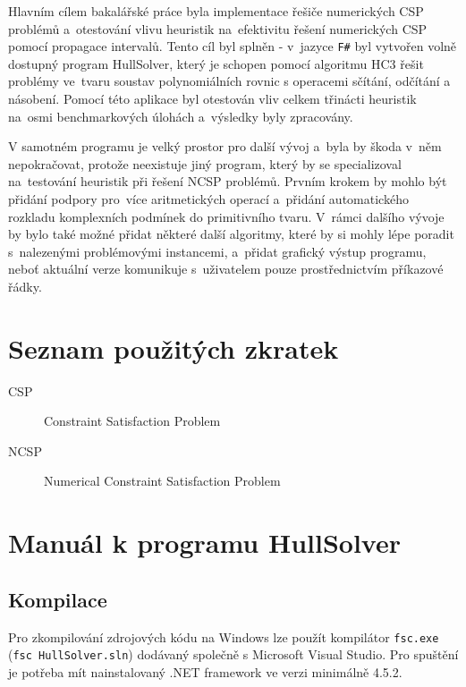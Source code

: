 \documentclass[thesis=B,czech]{FITthesis}[2012/06/26]
\theoremstyle{definition}
\begin{document}
\begin{conclusion}
Hlavním cílem bakalářské práce byla implementace řešiče numerických CSP problémů a~otestování vlivu heuristik na~efektivitu řešení numerických CSP pomocí propagace intervalů. Tento cíl byl splněn - v~jazyce \texttt{F\#} byl vytvořen volně dostupný program HullSolver, který je schopen pomocí algoritmu HC3 řešit problémy ve~tvaru soustav polynomiálních rovnic s operacemi sčítání, odčítání a násobení. Pomocí této aplikace byl otestován vliv celkem třinácti heuristik na~osmi benchmarkových úlohách a~výsledky byly zpracovány.

V samotném programu je velký prostor pro další vývoj a~byla by škoda v~něm nepokračovat, protože neexistuje jiný program, který by se specializoval na~testování heuristik při řešení NCSP problémů. Prvním krokem by mohlo být přidání podpory pro~více aritmetických operací a~přidání automatického rozkladu komplexních podmínek do primitivního tvaru. V~rámci dalšího vývoje by bylo také možné přidat některé další algoritmy, které by si mohly lépe poradit s~nalezenými problémovými instancemi, a~přidat grafický výstup programu, neboť aktuální verze komunikuje s~uživatelem pouze prostřednictvím příkazové řádky.




\end{conclusion}




\appendix

\chapter{Seznam použitých zkratek}
\begin{description}
	\item[CSP] Constraint Satisfaction Problem
	\item[NCSP] Numerical Constraint Satisfaction Problem
\end{description}



\chapter{Manuál k programu HullSolver}
\label{hullSolverManual}
\section{Kompilace}
Pro zkompilování zdrojových kódu na Windows lze použít kompilátor \verb|fsc.exe| (\verb|fsc HullSolver.sln|) dodávaný společně s Microsoft Visual Studio. Pro spuštění je potřeba mít nainstalovaný .NET framework ve verzi minimálně 4.5.2.
\end{document}
